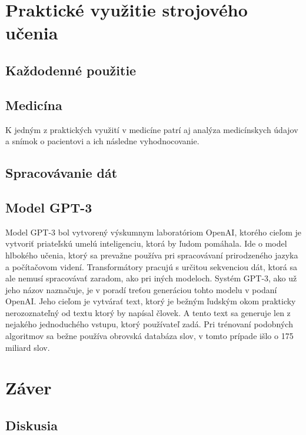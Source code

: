 \documentclass[8pt,twoside,slovak,a4paper]{article}
\begin{document}
\section{Praktické využitie strojového učenia} \label{vyuzitie}
\subsection{Každodenné použitie}
\subsection{Medicína}
K jedným z praktických využití v medicíne patrí aj analýza medicínskych údajov a snímok o pacientovi a ich následne vyhodnocovanie. \cite{heart_disease}
\subsection{Spracovávanie dát}
\subsection{Model GPT-3}
Model GPT-3 bol vytvorený výskumnym laboratóriom OpenAI, ktorého cieľom je vytvoriť priateľskú umelú inteligenciu, ktorá by ľudom pomáhala.\cite{GPT3} Ide o model hlbokého učenia, ktorý sa prevažne používa pri spracovávaní  prirodzeného jazyka a počítačovom videní. Transformátory pracujú s určitou sekvenciou dát, ktorá sa ale nemusí spracovávať zaradom, ako pri iných modeloch.\newline \hspace*{0.4cm} Systém GPT-3, ako už jeho názov naznačuje, je v poradí treťou generáciou tohto modelu v podaní OpenAI. Jeho cieľom je vytvárať text, ktorý je bežným ľudským okom prakticky nerozoznateľný od textu ktorý by napísal človek. A tento text sa generuje len z nejakého jednoduchého vstupu, ktorý používateľ zadá. Pri trénovaní podobných algoritmov sa bežne používa obrovská databáza slov, v tomto prípade išlo o 175 miliard slov.

\newpage
\section{Záver} \label{zaver}
\subsection{Diskusia} \label{diskusia}


 
\end{document}
